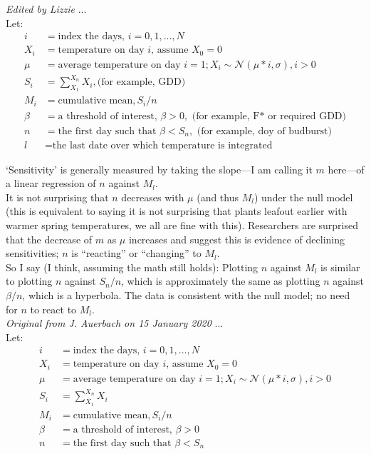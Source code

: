 \documentclass[11pt,letter]{article}
\begin{document}
\emph{Edited by Lizzie} ...\\
Let:
\begin{align*}
i & = \text{index the days, }  i = 0, 1, ..., N\\
X_i & = \text{temperature on day $i$, assume } X_0 = 0\\
\mu & = \text{average temperature on day } i = 1; X_i \sim \mathcal{N}(\mu * i, \sigma), i > 0\\
S_i & = \sum_{X_1}^{X_n} X_i,  \text{(for example, GDD)}\\
M_i & = \text{cumulative mean}, S_i / n \\
\beta & = \text{a threshold of interest, } \beta > 0, \text{ (for example, F* or required GDD)}\\
n &  = \text{the first day such that }  \beta < S_n, \text{ (for example, doy of budburst)}\\
l &  = \text{the last date over which temperature is integrated}
\end{align*}

`Sensitivity' is generally measured by taking the slope---I am calling it $m$ here---of a linear regression of $n$ against $M_l$.\\

It is not surprising that $n$ decreases with $\mu$ (and thus $M_l$) under the null model (this is equivalent to saying it is not surprising that plants leafout earlier with warmer spring temperatures, we all are fine with this). Researchers are surprised that the decrease of $m$ as $\mu$ increases and suggest this is evidence of declining sensitivities; $n$ is ``reacting'' or ``changing'' to $M_l$.\\

So I say (I think, assuming the math still holds): Plotting $n$ against $M_l$ is similar to plotting $n$ against $S_n / n$, which is approximately the same as plotting $n$ against $\beta/n$, which is a hyperbola. The data is consistent with the null model; no need for $n$ to react to $M_l$.\\

\newpage
\emph{Original from J. Auerbach on 15 January 2020} ...\\
Let:
\begin{align*}
i & = \text{index the days, }  i = 0, 1, ..., N\\
X_i & = \text{temperature on day $i$, assume } X_0 = 0\\
\mu & = \text{average temperature on day } i = 1; X_i \sim \mathcal{N}(\mu * i, \sigma), i > 0\\
S_i & = \sum_{X_1}^{X_n} X_i \\
M_i & = \text{cumulative mean}, S_i / n \\
\beta & = \text{a threshold of interest, } \beta > 0\\
n &  = \text{the first day such that }  \beta < S_n
\end{align*}
\end{document}
